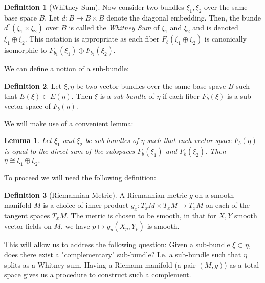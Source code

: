 \documentclass{article}
\newtheorem{lem}{Lemma}[section]
\theoremstyle{definition}
\newtheorem{defn}{Definition}[section]
\begin{document}
\begin{defn}[Whitney Sum]
Now consider two bundles $\xi_{1},\xi_{2}$ over the same base space $B$. Let $d:B\rightarrow B\times B$ denote the diagonal embedding. Then, the bunde $d^{*}(\xi_{1}\times\xi_{2})$ over $B$ is called the \textit{Whitney Sum} of $\xi_{1}$ and $\xi_{2}$ and is denoted $\xi_{1}\oplus\xi_{2}.$ This notation is appropriate as each fiber $F_{b}(\xi_{1}\oplus\xi_{2})$ is canonically isomorphic to $F_{b_{1}}(\xi_{1})\oplus F_{b_{2}}(\xi_{2}).$
\end{defn}
We can define a notion of a sub-bundle:
\begin{defn}
Let $\xi,\eta$ be two vector bundles over the same base spave $B$ such that $E(\xi)\subset E(\eta).$ Then $\xi$ is a \textit{sub-bundle} of $\eta$ if each fiber $F_{b}(\xi)$ is a sub-vector space of $F_{b}(\eta).$
\end{defn}
We will make use of a convenient lemma:
\begin{lem}
Let $\xi_{1}$ and $\xi_{2}$ be sub-bundles of $\eta$ such that each vector space $F_{b}(\eta)$ is equal to the direct sum of the subspaces $F_{b}(\xi_{1})$ and $F_{b}(\xi_{2}).$ Then $\eta\cong\xi_{1}\oplus\xi_{2}.$
\end{lem}
To proceed we will need the following definition:
\begin{defn}[Riemannian Metric]
A Riemannian metric $g$ on a smooth manifold $M$ is a choice of inner product $g_{x}:T_{x}M\times T_{x}M\rightarrow T_{x}M$ on each of the tangent spaces $T_{x}M$. The metric is chosen to be smooth, in that for $X,Y$ smooth vector fields on $M$, we have $p\mapsto g_{p}(X_{p},Y_{p})$ is smooth.  
\end{defn}
This will allow us to address the following question: Given a sub-bundle $\xi\subset\eta$, does there exist a "complementary" sub-bundle? I.e. a sub-bundle such that $\eta$ splits as a Whitney sum.  Having a Riemann manifold (a pair $(M,g)$) as a total space gives us a procedure to construct such a complement. 
\end{document}
